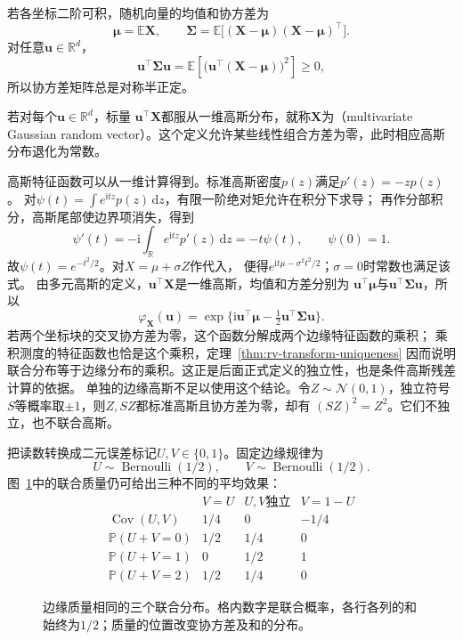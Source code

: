若各坐标二阶可积，随机向量的均值和协方差为
\[ \bm{\mu}=\mathbb{E}\bm{X},
  \qquad\bm{\Sigma}=\mathbb{E}\bigl[(\bm{X}-\bm{\mu})(\bm{X}-\bm{\mu})^{\top}\bigr]. \]
对任意\(\bm{u}\in\mathbb{R}^d\)，
\[
  \bm{u}^{\top}\bm{\Sigma}\bm{u}
  =\mathbb{E}\left[
    \bigl(\bm{u}^{\top}(\bm{X}-\bm{\mu})\bigr)^2
  \right]\geq0,
\]
所以协方差矩阵总是对称半正定。
\begin{definition}[多元高斯随机向量]
  \label{def:probability-multivariate-gaussian}
  若对每个\(\bm{u}\in\mathbb{R}^d\)，标量
\(\bm{u}^{\top}\bm{X}\)都服从一维高斯分布，就称\(\bm{X}\)为（multivariate Gaussian random vector）。这个定义允许某些线性组合方差为零，此时相应高斯分布退化为常数。
\end{definition}

高斯特征函数可以从一维计算得到。标准高斯密度\(p(z)\)满足\(p'(z)=-zp(z)\)。
对\(\psi(t)=\int e^{\mathrm itz}p(z)\,\mathrm dz\)，有限一阶绝对矩允许在积分下求导；
再作分部积分，高斯尾部使边界项消失，得到
\[
 \psi'(t)
 =-\mathrm i\int_{\mathbb R}e^{\mathrm itz}p'(z)\,\mathrm dz
 =-t\psi(t),\qquad \psi(0)=1.
\]
故\(\psi(t)=e^{-t^2/2}\)。对\(X=\mu+\sigma Z\)作代入，
便得\(e^{\mathrm it\mu-\sigma^2t^2/2}\)；\(\sigma=0\)时常数也满足该式。
由多元高斯的定义，\(\bm u^\top\bm X\)是一维高斯，均值和方差分别为
\(\bm u^\top\bm\mu\)与\(\bm u^\top\bm\Sigma\bm u\)，所以
\[
\varphi_{\bm X}(\bm u)
=\exp\{\mathrm i\bm u^\top\bm\mu-\tfrac12\bm u^\top\bm\Sigma\bm u\}.
\]
若两个坐标块的交叉协方差为零，这个函数分解成两个边缘特征函数的乘积；
乘积测度的特征函数也恰是这个乘积，定理~\ref{thm:rv-transform-uniqueness}
因而说明联合分布等于边缘分布的乘积。这正是后面正式定义的独立性，也是条件高斯残差计算的依据。
单独的边缘高斯不足以使用这个结论。令\(Z\sim\mathcal N(0,1)\)，独立符号\(S\)等概率取\(\pm1\)，则\(Z,SZ\)都标准高斯且协方差为零，却有
\((SZ)^2=Z^2\)。它们不独立，也不联合高斯。

把读数转换成二元误差标记\(U,V\in\{0,1\}\)。固定边缘规律为
\[
U\sim\operatorname{Bernoulli}(1/2),\qquad
V\sim\operatorname{Bernoulli}(1/2).
\]
图~\ref{fig:rv-dependence}中的联合质量仍可给出三种不同的平均效果：
\[
\begin{array}{c|ccc}
 & V=U & U,V\text{独立} & V=1-U\\ \hline
\operatorname{Cov}(U,V)&1/4&0&-1/4\\
\mathbb P(U+V=0)&1/2&1/4&0\\
\mathbb P(U+V=1)&0&1/2&1\\
\mathbb P(U+V=2)&1/2&1/4&0
\end{array}
\]
\begin{figure}[htbp]
\centering

\caption{边缘质量相同的三个联合分布。格内数字是联合概率，各行各列的和始终为\(1/2\)；质量的位置改变协方差及和的分布。}
\label{fig:rv-dependence}
\end{figure}

